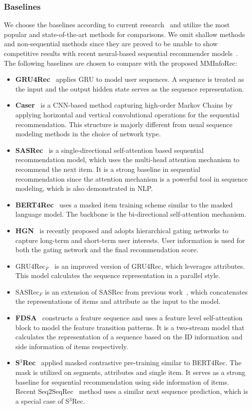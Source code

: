\documentclass[conference]{IEEEtran}
\begin{document}
\subsubsection{Baselines}
\label{sec:baseline}
We choose the baselines according to current research~\cite{s3rec,fdsa} and utilize the most popular and state-of-the-art methods for comparisons. We omit shallow methods and non-sequential methods since they are proved to be unable to show competitive results with recent neural-based sequential recommender models~\cite{s3rec,fdsa}. The following baselines are chosen to compare with the proposed MMInfoRec:
\begin{itemize}
    \item \textbf{GRU4Rec}~\cite{gru4rec} applies GRU to model user sequences. A sequence is treated as the input and the output hidden state serves as the sequence representation.
    \item \textbf{Caser}~\cite{caser} is a CNN-based method capturing high-order Markov Chains by applying horizontal and vertical convolutional operations for the sequential recommendation. This structure is majorly different from usual sequence modeling methods in the choice of network type.
    \item \textbf{SASRec}~\cite{sasrec} is a single-directional self-attention based sequential recommendation model, which uses the multi-head attention mechanism to recommend the next item. It is a strong baseline in sequential recommendation since the attention mechanism is a powerful tool in sequence modeling, which is also demonstrated in NLP.
    \item \textbf{BERT4Rec}~\cite{bert4rec} uses a masked item training scheme similar to the masked language model. The backbone is the bi-directional self-attention mechanism.
    \item \textbf{HGN}~\cite{hgn} is recently proposed and adopts hierarchical gating networks to capture long-term and short-term user interests. User information is used for both the gating network and the final recommendation score.
    \item \textbf{$\text{GRU4Rec}_F$}~\cite{gru4recf} is an improved version of GRU4Rec, which leverages attributes. This model calculates the sequence representation in a parallel style.
    \item \textbf{$\text{SASRec}_F$} is an extension of SASRec from previous work~\cite{s3rec}, which concatenates the representations of items and attribute as the input to the model.
    \item \textbf{FDSA}~\cite{fdsa} constructs a feature sequence and uses a feature level self-attention block to model the feature transition patterns. It is a two-stream model that calculates the representation of a sequence based on the ID information and side information of items respectively.
    \item \textbf{S$^3$Rec}~\cite{s3rec} applied masked contrastive pre-training similar to BERT4Rec. The mask is utilized on segments, attributes and single item. It serves as a strong baseline for sequential recommendation using side information of items. Recent Seq2SeqRec~\cite{s2s} method uses a similar next sequence prediction, which is a special case of S$^3$Rec.
\end{itemize}
\end{document}
